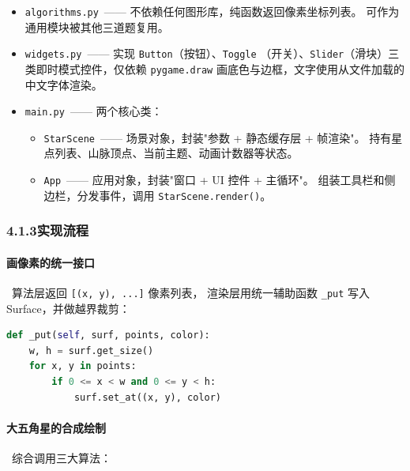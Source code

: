 \documentclass[12pt, a4paper]{article}
\begin{document}
\begin{itemize}[leftmargin=*]
    \item \texttt{algorithms.py}\ —— 不依赖任何图形库，纯函数返回像素坐标列表。
    可作为通用模块被其他三道题复用。
    \item \texttt{widgets.py}\ —— 实现 \texttt{Button}（按钮）、\texttt{Toggle}
    （开关）、\texttt{Slider}（滑块）三类即时模式控件，仅依赖 \texttt{pygame.draw}
    画底色与边框，文字使用从文件加载的中文字体渲染。
    \item \texttt{main.py}\ —— 两个核心类：
    \begin{itemize}
        \item \texttt{StarScene}\ —— 场景对象，封装"参数 + 静态缓存层 + 帧渲染"。
        持有星点列表、山脉顶点、当前主题、动画计数器等状态。
        \item \texttt{App}\ —— 应用对象，封装"窗口 + UI 控件 + 主循环"。
        组装工具栏和侧边栏，分发事件，调用 \texttt{StarScene.render()}。
    \end{itemize}
\end{itemize}

\subsubsection*{4.1.3\quad 实现流程}

\paragraph{画像素的统一接口}\ 算法层返回 \texttt{[(x, y), ...]} 像素列表，
渲染层用统一辅助函数 \texttt{\_put} 写入 Surface，并做越界裁剪：

\begin{lstlisting}[language=Python, caption={像素写入辅助}]
def _put(self, surf, points, color):
    w, h = surf.get_size()
    for x, y in points:
        if 0 <= x < w and 0 <= y < h:
            surf.set_at((x, y), color)
\end{lstlisting}

\paragraph{大五角星的合成绘制}\ 综合调用三大算法：
\end{document}
